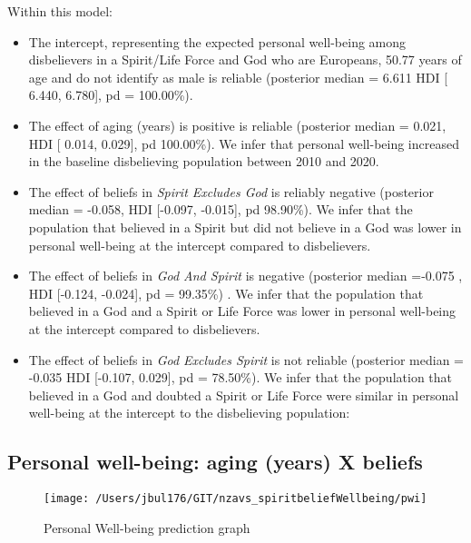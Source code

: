 \documentclass[
  english,
  man,floatsintext]{apa6}
\providecommand{\tightlist}{%
  \setlength{\itemsep}{0pt}\setlength{\parskip}{0pt}}
\begin{document}
Within this model:

\begin{itemize}
\tightlist
\item
  The intercept, representing the expected personal well-being among disbelievers in a Spirit/Life Force and God who are Europeans, 50.77 years of age and do not identify as male is reliable (posterior median = 6.611 HDI {[} 6.440, 6.780{]}, pd = 100.00\%).\\
\item
  The effect of aging (years) is positive is reliable (posterior median = 0.021, HDI {[} 0.014, 0.029{]}, pd 100.00\%). We infer that personal well-being increased in the baseline disbelieving population between 2010 and 2020.
\item
  The effect of beliefs in \emph{Spirit Excludes God} is reliably negative (posterior median = -0.058, HDI {[}-0.097, -0.015{]}, pd 98.90\%). We infer that the population that believed in a Spirit but did not believe in a God was lower in personal well-being at the intercept compared to disbelievers.
\item
  The effect of beliefs in \emph{God And Spirit} is negative (posterior median =-0.075 , HDI {[}-0.124, -0.024{]}, pd = 99.35\%) . We infer that the population that believed in a God and a Spirit or Life Force was lower in personal well-being at the intercept compared to disbelievers.
\item
  The effect of beliefs in \emph{God Excludes Spirit} is not reliable (posterior median = -0.035 HDI {[}-0.107, 0.029{]}, pd = 78.50\%). We infer that the population that believed in a God and doubted a Spirit or Life Force were similar in personal well-being at the intercept to the disbelieving population:
\end{itemize}

\hypertarget{personal-well-being-aging-years-x-beliefs}{%
\subsection{Personal well-being: aging (years) X beliefs}\label{personal-well-being-aging-years-x-beliefs}}

\begin{figure}
\texttt{[image: /Users/jbul176/GIT/nzavs\_spiritbeliefWellbeing/pwi]} \caption{Personal Well-being prediction graph}\label{fig:unnamed-chunk-2}
\end{figure}
\end{document}
